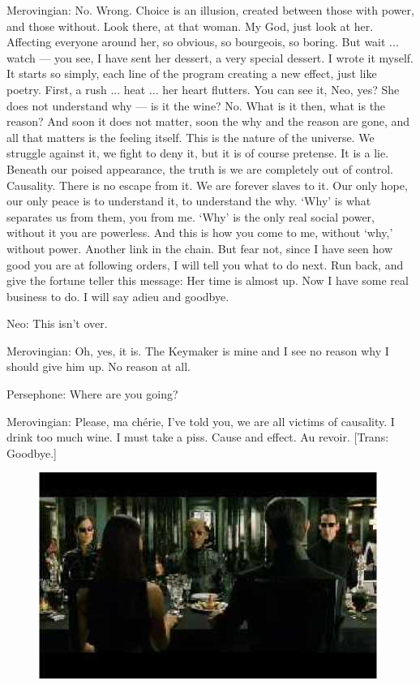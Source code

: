 \documentclass[UTF8]{ctexart}
\newenvironment{myquote}{\color{green} \setlength{\leftskip}{6em} \setlength{\rightskip}{4em} \setlength{\parindent}{-2em}}{\par}
\begin{document}
\begin{myquote}
Merovingian: No. Wrong. Choice is an illusion, created between those with power, and those without. Look there, at that woman. My God, just look at her. Affecting everyone around her, so obvious, so bourgeois, so boring. But wait ... watch --- you see, I have sent her dessert, a very special dessert. I wrote it myself. It starts so simply, each line of the program creating a new effect, just like poetry. First, a rush ... heat ... her heart flutters. You can see it, Neo, yes? She does not understand why --- is it the wine? No. What is it then, what is the reason? And soon it does not matter, soon the why and the reason are gone, and all that matters is the feeling itself. This is the nature of the universe. We struggle against it, we fight to deny it, but it is of course pretense. It is a lie. Beneath our poised appearance, the truth is we are completely out of control. Causality. There is no escape from it. We are forever slaves to it. Our only hope, our only peace is to understand it, to understand the why. `Why' is what separates us from them, you from me. `Why' is the only real social power, without it you are powerless. And this is how you come to me, without `why,' without power. Another link in the chain. But fear not, since I have seen how good you are at following orders, I will tell you what to do next. Run back, and give the fortune teller this message: Her time is almost up. Now I have some real business to do. I will say adieu and goodbye.

Neo: This isn't over.

Merovingian: Oh, yes, it is. The Keymaker is mine and I see no reason why I should give him up. No reason at all.

Persephone: Where are you going?

Merovingian: Please, ma chérie, I've told you, we are all victims of causality. I drink too much wine. I must take a piss. Cause and effect. Au revoir. [Trans: Goodbye.]
\end{myquote}

\begin{figure}[htb]
\centering
\includegraphics[width=0.5\linewidth]{fig/read_reloaded-94}
\end{figure}
\end{document}
